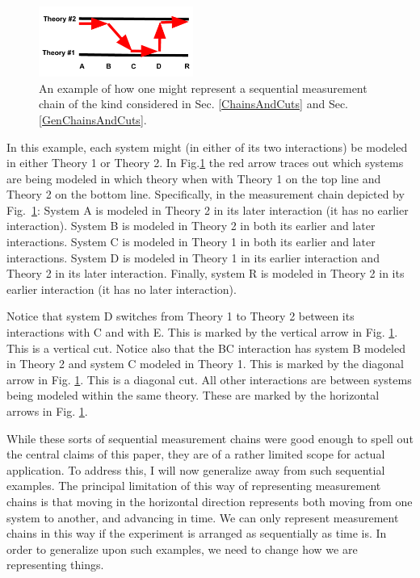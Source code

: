\documentclass[12pt,prd,superscriptaddress,floatfix,amsmath,amssymb,amsfonts,nofootinbib]{revtex4-2}
\begin{document}
\begin{figure}
\includegraphics[width=0.45\textwidth]{Figures/ExampleChain.pdf}
\caption{An example of how one might represent a sequential measurement chain of the kind considered in Sec. \ref{ChainsAndCuts} and Sec. \ref{GenChainsAndCuts}. }\label{FigExChain}
\end{figure}

In this example, each system might (in either of its two interactions) be modeled in either Theory 1 or Theory 2. In Fig.\ref{FigExChain} the red arrow traces out which systems are being modeled in which theory when with Theory 1 on the top line and Theory 2 on the bottom line. Specifically, in the measurement chain depicted by Fig.~\ref{FigExChain}: System A is modeled in Theory 2 in its later interaction (it has no earlier interaction). System B is modeled in Theory 2 in both its earlier and later interactions. System C is modeled in Theory 1 in both its earlier and later interactions. System D is modeled in Theory 1 in its earlier interaction and Theory 2 in its later interaction. Finally, system R is modeled in Theory 2 in its earlier interaction (it has no later interaction).

Notice that system D switches from Theory 1 to Theory 2 between its interactions with C and with E. This is marked by the vertical arrow in Fig. \ref{FigExChain}. This is a vertical cut. Notice also that the BC interaction has system  B modeled in Theory 2 and system C modeled in Theory 1. This is marked by the diagonal arrow in Fig. \ref{FigExChain}. This is a diagonal cut. All other interactions are between systems being modeled within the same theory. These are marked by the horizontal arrows in Fig. \ref{FigExChain}.

While these sorts of sequential measurement chains were good enough to spell out the central claims of this paper, they are of a rather limited scope for actual application. To address this, I will now generalize away from such sequential examples. The principal limitation of this way of representing measurement chains is that moving in the horizontal direction represents both moving from one system to another, and advancing in time. We can only represent measurement chains in this way if the experiment is arranged as sequentially as time is. In order to generalize upon such examples, we need to change how we are representing things.
\end{document}
